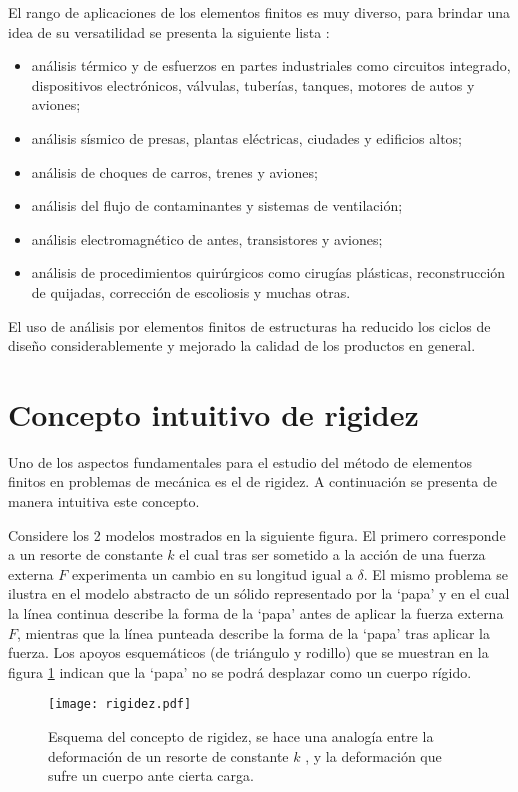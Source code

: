El rango de aplicaciones de los elementos finitos es muy diverso, para brindar una idea de su versatilidad se presenta la siguiente lista \cite{book:first_fem}:
\begin{itemize}
	\item análisis térmico y de esfuerzos en partes industriales como circuitos integrado, dispositivos electrónicos, válvulas, tuberías, tanques, motores de autos y aviones;
	\item análisis sísmico de presas, plantas eléctricas, ciudades y edificios altos;
	\item análisis de choques de carros, trenes y aviones;
	\item análisis del flujo de contaminantes y sistemas de ventilación;
	\item análisis electromagnético de antes, transistores y aviones;
	\item análisis de procedimientos quirúrgicos como cirugías plásticas, reconstrucción de quijadas, corrección de escoliosis y muchas otras.
\end{itemize}

El uso de análisis por elementos finitos de estructuras ha reducido los ciclos de diseño considerablemente y mejorado la calidad de los productos en general. 


\section{Concepto intuitivo de rigidez}
Uno de los aspectos fundamentales para el estudio del método de elementos
finitos en problemas de mecánica es el de rigidez. A continuación se presenta
de manera intuitiva este concepto.

Considere los 2 modelos mostrados en la siguiente figura. El primero 
corresponde a un resorte de constante $k$ el cual tras ser sometido a la acción 
de una fuerza externa $F$ experimenta un cambio en su longitud igual a 
$\delta$. El mismo problema se ilustra en el modelo abstracto de un sólido 
representado por la `papa' y en el cual la línea continua describe la forma de 
la `papa' antes de aplicar la fuerza externa $F$, mientras que la línea 
punteada describe la forma de la `papa' tras aplicar la fuerza. Los apoyos 
esquemáticos (de triángulo y rodillo) que se muestran en la figura 
\ref{fig:rigidez} indican que la `papa' no se podrá desplazar como un cuerpo 
rígido.

\begin{figure}[H]
\centering
\texttt{[image: rigidez.pdf]}
\caption{Esquema del concepto de rigidez, se hace una analogía entre la 
deformación de un resorte de constante $k$ , y la deformación que sufre un 
cuerpo ante cierta carga.}
\label{fig:rigidez}
\end{figure}

